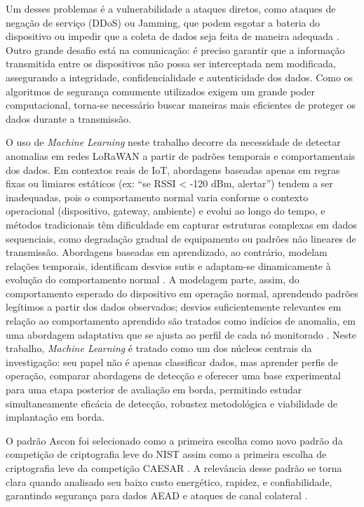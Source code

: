 Um desses problemas é a vulnerabilidade a ataques diretos, como ataques de negação de serviço (DDoS) ou Jamming, que podem esgotar a bateria do dispositivo ou impedir que a coleta de dados seja feita de maneira adequada \cite{hessel2023lorawan}. Outro grande desafio está na comunicação: é preciso garantir que a informação transmitida entre os dispositivos não possa ser interceptada nem modificada, assegurando a integridade, confidencialidade e autenticidade dos dados. Como os algoritmos de segurança comumente utilizados exigem um grande poder computacional, torna-se necessário buscar maneiras mais eficientes de proteger os dados durante a transmissão.

O uso de \textit{Machine Learning} neste trabalho decorre da necessidade de
detectar anomalias em redes LoRaWAN a partir de padrões temporais e
comportamentais dos dados. Em contextos reais de IoT, abordagens baseadas
apenas em regras fixas ou limiares estáticos (ex: ``se RSSI < -120 dBm, alertar'') tendem a ser inadequadas, pois o
comportamento normal varia conforme o contexto operacional (dispositivo,
gateway, ambiente) e evolui ao longo do tempo, e métodos
tradicionais têm dificuldade em capturar estruturas complexas em dados
sequenciais, como degradação gradual de equipamento ou padrões não
lineares de transmissão. Abordagens baseadas em aprendizado, ao contrário,
modelam relações temporais, identificam desvios sutis e adaptam-se
dinamicamente à evolução do comportamento normal \cite{chalapathy2019}. A modelagem parte, assim, do comportamento esperado do dispositivo em operação normal, aprendendo padrões legítimos a partir dos dados observados; desvios suficientemente relevantes em relação ao comportamento aprendido são tratados como indícios de anomalia, em uma abordagem adaptativa que se ajusta ao perfil de cada nó monitorado \cite{hayashi2022handsfree}. Neste trabalho, \textit{Machine Learning} é tratado como um dos núcleos centrais da investigação: seu papel não é apenas classificar dados, mas aprender perfis de operação, comparar abordagens de detecção e oferecer uma base experimental para uma etapa posterior de avaliação em borda, permitindo estudar simultaneamente eficácia de detecção, robustez metodológica e viabilidade de implantação em borda.

O padrão Ascon foi selecionado como a primeira escolha como novo padrão da competição de criptografia leve do NIST  assim como a primeira escolha de criptografia leve da competição CAESAR \cite{caesar_submissions}. A relevância desse padrão se torna clara quando analisado seu baixo custo energético, rapidez, e confiabilidade, garantindo segurança para dados AEAD e ataques de canal colateral \cite{ascon_official}.

